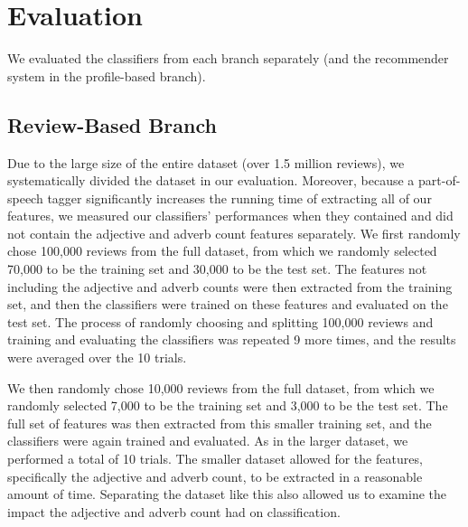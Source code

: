 \section{Evaluation}

We evaluated the classifiers from each branch separately (and the recommender system in the profile-based branch).

\subsection{Review-Based Branch}
Due to the large size of the entire dataset (over 1.5 million reviews), we systematically divided the dataset in our evaluation. Moreover, because a part-of-speech tagger significantly increases the running time of extracting all of our features, we measured our classifiers' performances when they contained and did not contain the adjective and adverb count features separately. We first randomly chose 100,000 reviews from the full dataset, from which we randomly selected 70,000 to be the training set and 30,000 to be the test set. The features not including the adjective and adverb counts were then extracted from the training set, and then the classifiers were trained on these features and evaluated on the test set. The process of randomly choosing and splitting 100,000 reviews and training and evaluating the classifiers was repeated 9 more times, and the results were averaged over the 10 trials.

We then randomly chose 10,000 reviews from the full dataset, from which we randomly selected 7,000 to be the training set and 3,000 to be the test set. The full set of features was then extracted from this smaller training set, and the classifiers were again trained and evaluated. As in the larger dataset, we performed a total of 10 trials. The smaller dataset allowed for the features, specifically the adjective and adverb count, to be extracted in a reasonable amount of time. Separating the dataset like this also allowed us to examine the impact the adjective and adverb count had on classification.

